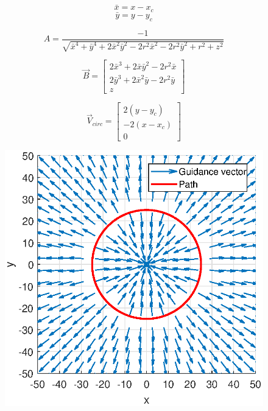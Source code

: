 \documentclass[conf]{new-aiaa}
\begin{document}
\begin{equation}
\bar{x} = x - x_c
\end{equation}
\begin{equation}
\bar{y} = y - y_c
\end{equation}


\begin{equation}
A = \dfrac{-1}{\sqrt{\bar{x}^4+\bar{y}^4+2\bar{x}^2\bar{y}^2-2r^2\bar{x}^2-2r^2\bar{y}^2+r^2+z^2}}
\end{equation}

\begin{equation}
\overrightarrow{B} = \begin{bmatrix} 2\bar{x}^3+2\bar{x}\bar{y}^2-2r^2\bar{x} \\ 2\bar{y}^3+2\bar{x}^2\bar{y}-2r^2\bar{y} \\z \end{bmatrix}
\end{equation}



\begin{equation}\label{eq:vcirc_circle}
\overrightarrow{V}_{circ} =  \begin{bmatrix}  2(y-y_c) \\[6pt] -2(x-x_c) \\[6pt] 0\end{bmatrix}
\end{equation}

\begin{figure}[H]
	\centering
	\includegraphics[width=0.7\linewidth]{Figures/methods/largeRepulsive}
	\caption{}
	\label{fig:largerepulsive}
\end{figure}
\end{document}
